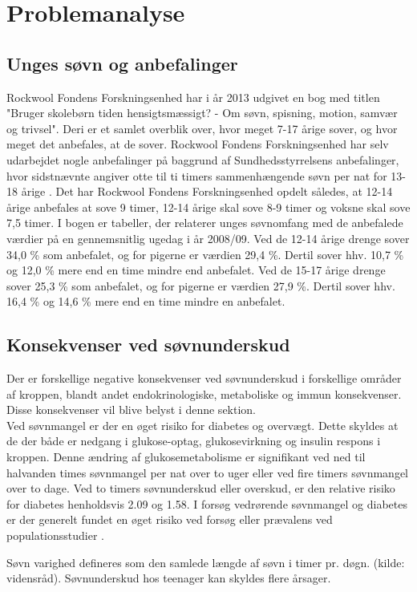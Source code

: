 \chapter{Problemanalyse}
\label{cha:Problemanalyse}


\section{Unges søvn og anbefalinger}
\label{sec:UngesSoevnOgAnbefalinger}



Rockwool Fondens Forskningsenhed har i år 2013 udgivet en bog med titlen "Bruger skolebørn tiden hensigtsmæssigt? - Om søvn, spisning, motion, samvær og trivsel". Deri er et samlet overblik over, hvor meget 7-17 årige sover, og hvor meget det anbefales, at de sover. Rockwool Fondens Forskningsenhed har selv udarbejdet nogle anbefalinger på baggrund af Sundhedsstyrrelsens anbefalinger, hvor sidstnævnte angiver otte til ti timers sammenhængende søvn per nat for 13-18 årige \cite{Sundhedsstyrrelsen2011}. Det har Rockwool Fondens Forskningsenhed opdelt således, at 12-14 årige anbefales at sove 9 timer, 12-14 årige skal sove 8-9 timer og voksne skal sove 7,5 timer. I bogen er tabeller, der relaterer unges søvnomfang med de anbefalede værdier på en gennemsnitlig ugedag i år 2008/09. Ved de 12-14 årige drenge sover 34,0 \% som anbefalet, og for pigerne er værdien 29,4 \%. Dertil sover hhv. 10,7 \% og 12,0 \% mere end en time mindre end anbefalet. Ved de 15-17 årige drenge sover 25,3 \% som anbefalet, og for pigerne er værdien 27,9 \%. Dertil sover hhv. 16,4 \% og 14,6 \% mere end en time mindre en anbefalet. \cite{Bonke2013}




\section{Konsekvenser ved søvnunderskud}
\label{sec:konsekvenser}

Der er forskellige negative konsekvenser ved søvnunderskud i forskellige områder af kroppen, blandt andet endokrinologiske, metaboliske og immun konsekvenser. Disse konsekvenser vil blive belyst i denne sektion.
\\
Ved søvnmangel er der en øget risiko for diabetes og overvægt. Dette skyldes at de der både er nedgang i glukose-optag, glukosevirkning og insulin respons i kroppen. Denne ændring af glukosemetabolisme er signifikant ved ned til halvanden times søvnmangel per nat over to uger eller ved fire timers søvnmangel over to dage. \cite{https://www.ncbi.nlm.nih.gov/pmc/articles/PMC1991337/} 
Ved to timers søvnunderskud eller overskud, er den relative risiko for diabetes henholdsvis 2.09 og 1.58\cite{https://www.ncbi.nlm.nih.gov/pubmed/17717644/ (kædesøgning fra https://www.ncbi.nlm.nih.gov/pmc/articles/PMC3132857/) }. I forsøg vedrørende søvnmangel og diabetes er der generelt fundet en øget risiko ved forsøg eller prævalens ved populationsstudier\cite{https://www.ncbi.nlm.nih.gov/pmc/articles/PMC3132857/} .



Søvn varighed defineres som den samlede længde af søvn i timer pr. døgn. (kilde: vidensråd). 
Søvnunderskud hos teenager kan skyldes flere årsager. 


